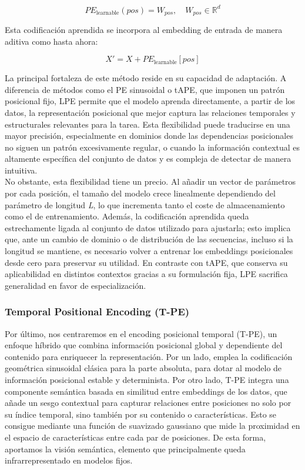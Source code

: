 $$
PE_{\text{learnable}}(pos) = W_{pos}, \quad W_{pos} \in \mathbb{R}^d
$$

Esta codificación aprendida se incorpora al embedding de entrada de manera aditiva como hasta ahora:


$$
X' = X + PE_{\text{learnable}}[pos]
$$

La principal fortaleza de este método reside en su capacidad de adaptación. A diferencia de métodos como el PE sinusoidal o tAPE, que imponen un patrón posicional fijo, LPE permite que el modelo aprenda directamente, a partir de los datos, la representación posicional que mejor captura las relaciones temporales y estructurales relevantes para la tarea. Esta flexibilidad puede traducirse en una mayor precisión, especialmente en dominios donde las dependencias posicionales no siguen un patrón excesivamente regular, o cuando la información contextual es altamente específica del conjunto de datos y es compleja de detectar de manera intuitiva.\\

No obstante, esta flexibilidad tiene un precio. Al añadir un vector de parámetros por cada posición, el tamaño del modelo crece linealmente dependiendo del parámetro de longitud \textit{L}, lo que incrementa tanto el coste de almacenamiento como el de entrenamiento. Además, la codificación aprendida queda estrechamente ligada al conjunto de datos utilizado para ajustarla; esto implica que, ante un cambio de dominio o de distribución de las secuencias, incluso si la longitud se mantiene, es necesario volver a entrenar los embeddings posicionales desde cero para preservar su utilidad. En contraste con tAPE, que conserva su aplicabilidad en distintos contextos gracias a su formulación fija, LPE sacrifica generalidad en favor de especialización.


\subsubsection{Temporal Positional Encoding (T-PE)}

Por último, nos centraremos en el encoding posicional temporal (T-PE), un enfoque híbrido que combina información posicional global y dependiente del contenido para enriquecer la representación. Por un lado, emplea la codificación geométrica sinusoidal clásica para la parte absoluta, para dotar al modelo de información posicional estable y determinista. Por otro lado, T-PE integra una componente semántica basada en similitud entre embeddings de los datos, que añade un sesgo contextual para capturar relaciones entre posiciones no solo por su índice temporal, sino también por su contenido o características. Esto se consigue mediante una función de suavizado gaussiano que mide la proximidad en el espacio de características entre cada par de posiciones. De esta forma, aportamos la visión semántica, elemento que principalmente queda infrarrepresentado en modelos fijos.\\

